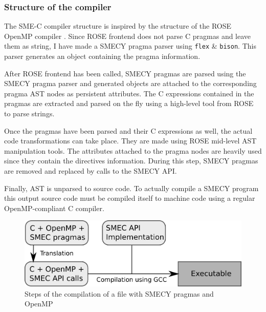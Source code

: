 \documentclass[a4paper]{article}
\begin{document}
	\subsubsection{Structure of the compiler}
	The SME-C compiler structure is inspired by the structure of the ROSE OpenMP compiler \cite{roseomp}. Since ROSE frontend does not parse C pragmas and leave them as string, I have made a SMECY pragma parser using \texttt{flex} \& \texttt{bison}. This parser generates an object containing the pragma information.
	
	After ROSE frontend has been called, SMECY pragmas are parsed using the SMECY pragma parser and generated objects are attached to the corresponding pragma AST nodes as persistent attributes. The C expressions contained in the pragmas are extracted and parsed on the fly using a high-level tool from ROSE to parse strings.
	
	Once the pragmas have been parsed and their C expressions as well, the actual code transformations can take place. They are made using ROSE mid-level AST manipulation tools. The attributes attached to the pragma nodes are heavily used since they contain the directives information. During this step, SMECY pragmas are removed and replaced by calls to the SMECY API.
	
	Finally, AST is unparsed to source code. To actually compile a SMECY program this output source code must be compiled itself to machine code using a regular OpenMP-compliant C compiler.
	
 
\begin{figure}[h]
\centering
 	\includegraphics{compiler.png}
  \caption{Steps of the compilation of a file with SMECY pragmas and OpenMP}
\end{figure}
	
	
\end{document}
